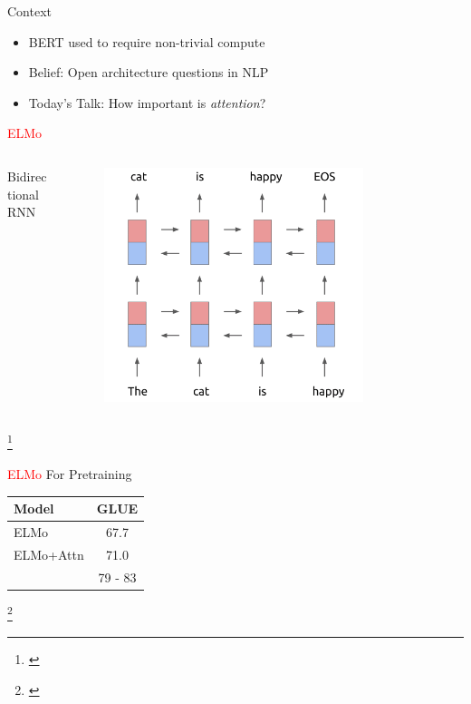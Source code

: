 \documentclass[14pt,aspectratio=169]{beamer}
\newcommand\blfootnote[1]{%
\begingroup
\renewcommand\thefootnote{}\footnote{#1}%
\addtocounter{footnote}{-1}%
\endgroup
}
\begin{document}
\begin{frame}{Context}
    \begin{itemize}
        \item BERT used to require non-trivial compute 
        \item Belief: Open architecture questions in NLP
        \item Today's Talk: How important is \textit{attention}?
    \end{itemize}
\end{frame}


\begin{frame}{\textcolor{red}{ELMo} }

    \begin{columns}
    \begin{column}{0.3\linewidth}
    \centerline{Bidirectional RNN}
    \end{column}
    \begin{column}{0.7\linewidth}
    
    \begin{figure}
    \includegraphics[width=0.8\textwidth]{Figs/elmo.png}
    \end{figure}
    \end{column}
    \end{columns}
    \blfootnote{\cite{DBLP:conf/naacl/PetersNIGCLZ18}}

\end{frame}

\begin{frame}{\textcolor{red}{ELMo} For Pretraining}
    \begin{table}
    \begin{tabular}{lc}
        \toprule
        Model & GLUE\\
        \midrule 
         ELMo& 67.7  \\
         ELMo+Attn&  71.0\\ 
         \visible<2>{BERT-Base & 79 - 83} \\
        \bottomrule
    \end{tabular}
    \end{table}
\blfootnote{\cite{DBLP:conf/naacl/PetersNIGCLZ18, devlin2018bert}}
\end{frame}
\end{document}
